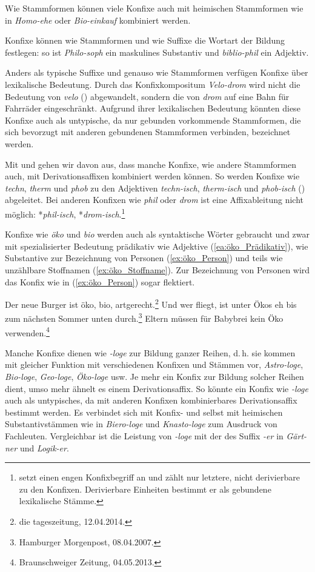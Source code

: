 Wie Stammformen können viele Konfixe auch mit heimischen Stammformen wie in \textit{Homo-ehe} oder \textit{Bio-einkauf} kombiniert werden. 

Konfixe können wie Stammformen und wie Suffixe die Wortart der Bildung festlegen: so ist \textit{Philo-soph} ein maskulines Substantiv und \textit{biblio-phil} ein Adjektiv.

Anders als typische Suffixe und genauso wie Stammformen verfügen Konfixe über lexikalische Bedeutung. Durch das Konfixkompositum \textit{Velo-drom} wird nicht die Bedeutung von \textit{velo} () abgewandelt, sondern die von \textit{drom} auf eine Bahn für Fahrräder eingeschränkt. Aufgrund ihrer lexikalischen Bedeutung könnten diese Konfixe auch als untypische, da nur gebunden vorkommende Stammformen, die sich bevorzugt mit anderen gebundenen Stammformen verbinden, bezeichnet werden.

Mit \citet[63]{FleischerBarz2012} und \citet[22]{Donalies2005WbÜb} gehen wir davon aus, dass manche Konfixe, wie andere Stammformen auch, mit Derivationsaffixen kombiniert werden können. So werden Konfixe wie \textit{techn}, \textit{therm} und \textit{phob} zu den Adjektiven \textit{techn-isch}, \textit{therm-isch} und \textit{phob-isch} () abgeleitet. Bei anderen Konfixen wie \textit{phil} oder \textit{drom} ist eine Affixableitung nicht möglich: *\textit{phil-isch}, *\textit{drom-isch}.\footnote{\citet[254]{Eisenberg2020_Wort} setzt einen engen Konfixbegriff an und zählt nur letztere, nicht derivierbare zu den Konfixen. Derivierbare Einheiten bestimmt er als gebundene lexikalische Stämme.}


Konfixe wie \textit{öko} und \textit{bio} werden auch als syntaktische Wörter gebraucht und zwar mit spezialisierter Bedeutung prädikativ wie Adjektive (\ref{ea:öko_Prädikativ}), wie Substantive zur Bezeichnung von Personen (\ref{ex:öko_Person}) und teils wie unzählbare Stoffnamen (\ref{ex:öko_Stoffname}). Zur Bezeichnung von Personen wird das Konfix wie in (\ref{ex:öko_Person}) sogar flektiert.

\ea \label{ea:öko_Stammform}
\ea \label{ea:öko_Prädikativ} Der neue Burger ist öko, bio, artgerecht.\footnote{die tageszeitung, 12.04.2014.}
\ex \label{ex:öko_Person} Und wer fliegt, ist unter Ökos eh bis zum nächsten Sommer unten durch.\footnote{Hamburger Morgenpost, 08.04.2007.}
\ex \label{ex:öko_Stoffname} Eltern müssen für Babybrei kein Öko verwenden.\footnote{Braunschweiger Zeitung, 04.05.2013.}
\z 
\z 

Manche Konfixe dienen wie \textit{-loge} zur Bildung ganzer Reihen, d.\,h. sie kommen mit gleicher Funktion mit verschiedenen Konfixen und Stämmen vor, \zB \textit{Astro-loge}, \textit{Bio-loge}, \textit{Geo-loge}, \textit{Öko-loge} usw. Je mehr ein Konfix zur Bildung solcher Reihen dient, umso mehr ähnelt es einem Derivationsaffix. So könnte ein Konfix wie \textit{-loge} auch als untypisches, da mit anderen Konfixen kombinierbares Derivationsaffix bestimmt werden. Es verbindet sich mit Konfix- und selbst mit heimischen Substantivstämmen wie in \textit{Biero-loge} und \textit{Knasto-loge} zum Ausdruck von Fachleuten. Vergleichbar ist die Leistung von \textit{-loge} mit der des Suffix \textit{-er} in \textit{Gärt-ner} und \textit{Logik-er}.  

